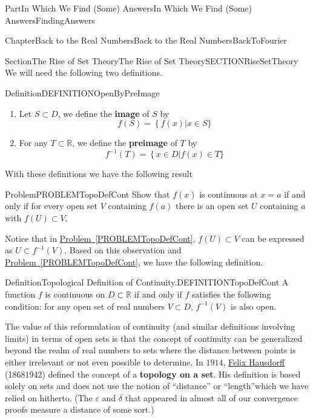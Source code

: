 \documentclass[oneside,10pt,]{book}
\newcommand{\xreffont}{\relax}
\newcommand{\terminology}[1]{\textbf{#1}}
\numberwithin{equation}{part}
\newcommand{\eps}{\varepsilon}
\newcommand{\RR}{\mathbb {R}}
\begin{document}
\begin{partptx}{Part}{In Which We Find (Some) Answers}{}{In Which We Find (Some) Answers}{}{}{FindingAnswers}
\begin{chapterptx}{Chapter}{Back to the Real Numbers}{}{Back to the Real Numbers}{}{}{BackToFourier}
\begin{sectionptx}{Section}{The Rise of Set Theory}{}{The Rise of Set Theory}{}{}{SECTIONRiseSetTheory}
We will need the following two definitions.%
\begin{definition}{Definition}{}{DEFINITIONOpenByPreImage}%
%
%
%
%
%
%
%
\begin{enumerate}[label={(\arabic*)}]
\item{}Let \(S\subset D\), we define the \terminology{image} of \(S\) by%
\begin{equation*}
f\left(S\right)=\left\{f\left(x\right)\right|x\in S\}
\end{equation*}
%
\item{}For any \(T\subset \mathbb{R}\), we define the \terminology{preimage} of \(T\) by%
\begin{equation*}
f^{-1}\left(T\right)=\left\{x\in D\right|f\left(x\right)\in T\}
\end{equation*}
%
\end{enumerate}
%
\end{definition}
With these definitions we have the following result%
\begin{problem}{Problem}{}{PROBLEMTopoDefCont}%
Show that \(f(x)\) is continuous at \(x=a\) if and only if for every open set \(V\) containing \(f(a)\) there is an open set \(U\) containing \(a\) with \(f(U)\subset{V}\).%
\end{problem}
Notice that in \hyperref[PROBLEMTopoDefCont]{Problem~{\xreffont\ref{PROBLEMTopoDefCont}}}, \(f\left(U\right)\subset
V\) can be expressed as \(U\subset f^{-1}(V)\).  Based on this observation and \hyperref[PROBLEMTopoDefCont]{Problem~{\xreffont\ref{PROBLEMTopoDefCont}}}, we have the following definition.%
\begin{definition}{Definition}{Topological Definition of Continuity.}{DEFINITIONTopoDefCont}%
A function  \(f\) is continuous on \(D\subset \RR{}\) if and only if \(f\) satisfies the following condition: for any open set of real numbers \(V\subset D\), \(f^{-1}(V)\) is also open.%
\end{definition}
The value of this reformulation of continuity (and similar definitions involving limits) in terms of open sets is that the concept of continuity can be generalized beyond the realm of real numbers to sets where the distance between points is either irrelevant or not even possible to determine. In \(1914\), \href{https://mathshistory.st-andrews.ac.uk/Biographies/Hausdorff/}{Felix Hausdorff} (1868\textendash{}1942) defined the concept of a \terminology{topology on a set}. His definition is based solely on sets and does not use the notion of ``distance'' or ``length''which we have relied on hitherto. (The \(\eps\) and \(\delta \) that appeared in almost all of our convergence proofs measure a distance of some sort.)%

\end{sectionptx}
\end{chapterptx}
\end{partptx}
\end{document}
